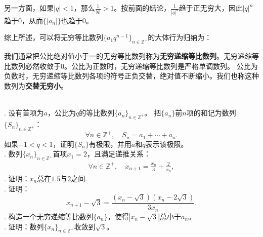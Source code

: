 \documentclass[12pt,UTF8,fontset=none]{ctexbook}
\begin{document}

另一方面，如果$|q| < 1$，那么$\displaystyle\frac{1}{|q|} > 1$。按前面的结论，$\frac{1}{|q|^n}$趋于正无穷大，因此$|q|^n$趋于$0$，从而$\{|a_n|\}$也趋于$0$。

综上所述，可以将无穷等比数列$\{a_1 q^{n-1}\}_{n\in\mathbb{Z}^+}$的大体行为归纳为：

\begin{center}
\end{center}

我们通常把公比绝对值小于一的无穷等比数列称为\textbf{无穷递缩等比数列}。无穷递缩等比数列必然收敛于$0$。公比为正数时，无穷递缩等比数列是严格单调数列。
公比为负数时，无穷递缩等比数列各项的符号正负交替，绝对值不断缩小。我们也称这种数列为\textbf{交替无穷小}。

\begin{xt}
    \mbox{}\\
    . 设有首项为$a$，公比为$q$的等比数列$\{a_n\}_{n\in\mathbb{Z}^+}$。
    把$\{a_n\}$前$n$项的和记为数列$\{S_n\}_{n\in\mathbb{Z}^+}$：
    $$ \forall n \in \mathbb{Z}^+ , \quad S_n = a_1 + \cdots + a_n. $$
    如果$-1<q<1$，证明$\{S_n\}$有极限，并用$a$和$q$表示该极限。\\
    . 数列$\{x_n\}_{n\in\mathbb{Z}^+}$首项$ x_1 = 2$，且满足递推关系：
    \begin{align*}
        \forall n\in\mathbb{Z}^+, \quad x_{n+1} = \frac{x_n}{3} + \frac{2}{x_n},
    \end{align*}
    . 证明：$x_n$总在$1.5$与$2$之间.\\
    . 证明：
    $$x_{n+1} - \sqrt{3} = \frac{(x_n - \sqrt{3})(x_n - 2\sqrt{3})}{3x_n}.$$
    . 构造一个无穷递缩等比数列$\{a_n\}$，使得$|x_n - \sqrt{3}|$总小于$a_n$。\\
    . 证明：数列$\{x_n\}_{n\in\mathbb{Z}^+}$收敛到$\sqrt{3}$。
\end{xt}
\end{document}
